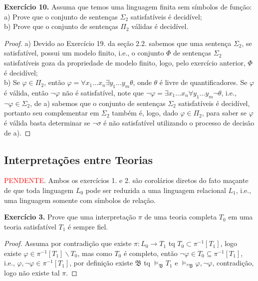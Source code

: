 \documentclass[11pt]{article}
\newcommand{\mf}[1]{\mathfrak{#1}}
\newcommand{\subs}[2]{
    \setcounter{subsection}{#1 - 1}
    \subsection{#2}
    }
\begin{document}
\begin{shaded}
\textbf{Exercício 10.} Assuma que temos uma linguagem finita sem símbolos de função:\\
a) Prove que o conjunto de sentenças $\Sigma_2$ satisfatíveis é decidível;\\
b) Prove que o conjunto de sentenças $\Pi_2$ válidas é decidível.
\end{shaded}

\begin{proof}
    a) Devido ao Exercício 19. da seção 2.2. sabemos que uma sentença $\Sigma_2$, se satisfatível, possui um modelo finito, i.e., o conjunto $\Phi$ de sentenças $\Sigma_2$ satisfatíveis goza da propriedade de modelo finito, logo, pelo exercício anterior, $\Phi$ é decidível;\\
    b) Se $\varphi\in\Pi_2$, então $\varphi=\forall x_1\dots x_n\exists y_1\dots y_m\theta$, onde $\theta$ é livre de quantificadores. Se $\varphi$ é válida, então $\neg\varphi$ não é satisfatível, note que $\neg\varphi=\exists x_1\dots x_n\forall y_1\dots y_m\neg\theta$, i.e., $\neg\varphi\in\Sigma_2$, de a) sabemos que o conjunto de sentenças $\Sigma_2$ satisfatíveis é decidível, portanto seu complementar em $\Sigma_2$ também é, logo, dado $\varphi\in\Pi_2$, para saber se $\varphi$ é válida basta determinar se $\neg\sigma$ é não satisfatível utilizando o processo de decisão de a).
\end{proof}

\subs{7}{Interpretações entre Teorias}

\textcolor{red}{PENDENTE}. Ambos os exercícios 1. e 2. são corolários diretos do fato maçante de que toda linguagem $L_0$ pode ser reduzida a uma linguagem relacional $L_1$, i.e., uma linguagem somente com símbolos de relação.

\begin{shaded}
\textbf{Exercício 3.} Prove que uma interpretação $\pi$ de uma teoria completa $T_0$ em uma teoria satisfatível $T_1$ é sempre fiel.
\end{shaded}

\begin{proof}
    Assuma por contradição que existe $\pi:L_0\to T_1$ tq $T_0\subset\pi^{-1}[T_1]$, logo existe $\varphi\in\pi^{-1}[T_1]\backslash T_0$, mas como $T_0$ é completo, então $\neg\varphi\in T_0\subseteq\pi^{-1}[T_1]$, i.e., $\varphi,\neg\varphi\in\pi^{-1}[T_1]$, por definição existe $\mf{B}$ tq $\vDash_\mf{B}T_1$ e $\vDash_{^\pi\mf{B}}\varphi,\neg\varphi$, contradição, logo não existe tal $\pi$.
\end{proof}
\end{document}

